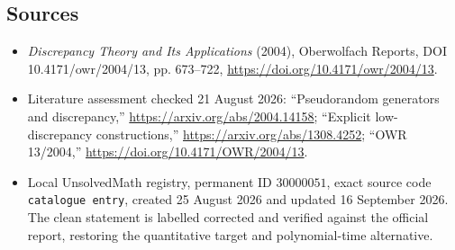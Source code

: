 \documentclass[11pt]{article}
\begin{document}
\subsection{Sources}
\begin{itemize}
\item \emph{Discrepancy Theory and Its Applications} (2004), Oberwolfach Reports, DOI 10.4171/owr/2004/13, pp. 673--722, \url{https://doi.org/10.4171/owr/2004/13}.
\item Literature assessment checked 21 August 2026: ``Pseudorandom generators and discrepancy,'' \url{https://arxiv.org/abs/2004.14158}; ``Explicit low-discrepancy constructions,'' \url{https://arxiv.org/abs/1308.4252}; ``OWR 13/2004,'' \url{https://doi.org/10.4171/OWR/2004/13}.
\item Local UnsolvedMath registry, permanent ID $30000051$, exact source code \texttt{catalogue entry}, created 25 August 2026 and updated 16 September 2026. The clean statement is labelled corrected and verified against the official report, restoring the quantitative target and polynomial-time alternative.
\end{itemize}
\end{document}
